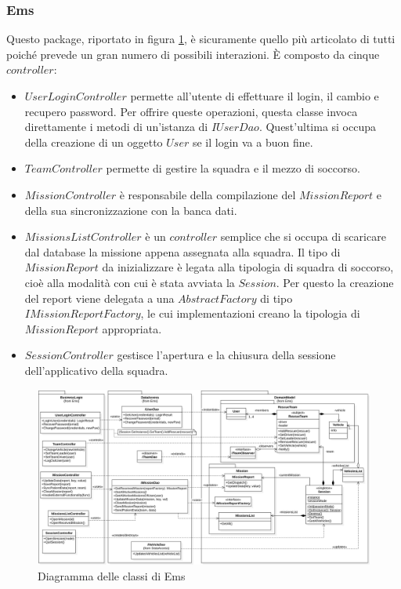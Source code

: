 \documentclass{article}
\begin{document}
    \subsubsection{Ems}
    Questo package, riportato in figura \ref{fig:uml-ems}, è sicuramente quello più articolato di tutti poiché prevede un gran numero di possibili interazioni.
    È composto da cinque $controller$:
    \begin{itemize}
        \item $UserLoginController$ permette all'utente di effettuare il login, il cambio e recupero password.
        Per offrire queste operazioni, questa classe invoca direttamente i metodi di un'istanza di $IUserDao$.
        Quest'ultima si occupa della creazione di un oggetto $User$ se il login va a buon fine.
        \item $TeamController$ permette di gestire la squadra e il mezzo di soccorso.
        \item $MissionController$ è responsabile della compilazione del $MissionReport$ e della sua sincronizzazione con la banca dati.
        \item $MissionsListController$ è un $controller$ semplice che si occupa di scaricare dal database la missione appena assegnata alla squadra.
        Il tipo di $MissionReport$ da inizializzare è legata alla tipologia di squadra di soccorso, cioè alla modalità con cui è stata avviata la $Session$.
        Per questo la creazione del report viene delegata a una $AbstractFactory$ di tipo $IMissionReportFactory$, le cui implementazioni creano la tipologia di $MissionReport$ appropriata.
        \item $SessionController$ gestisce l'apertura e la chiusura della sessione dell'applicativo della squadra.
    \end{itemize}
    \begin{figure}[!h]
        \centering
        \includegraphics[width=6in]{diagrams/png/uml-ems.png}
        \caption{Diagramma delle classi di Ems}
        \label{fig:uml-ems}
    \end{figure}
\end{document}
